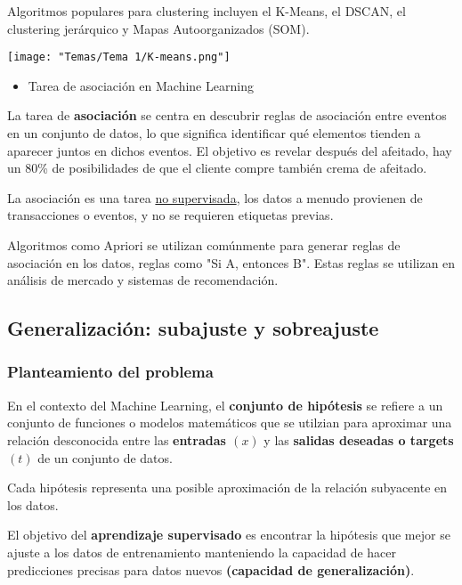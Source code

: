 Algoritmos populares para clustering incluyen el K-Means, el DSCAN, el clustering jerárquico y Mapas Autoorganizados (SOM).

\begin{center}
\texttt{[image: "Temas/Tema 1/K-means.png"]}
\end{center}
\begin{itemize}[label=\color{red}\textbullet, leftmargin=*]
	\item \color{lightblue}Tarea de asociación en Machine Learning
\end{itemize}

La tarea de \textbf{asociación} se centra en descubrir reglas de asociación entre eventos en un conjunto de datos, lo que significa identificar qué elementos tienden a aparecer juntos en dichos eventos. El objetivo es revelar después del afeitado, hay un 80\% de posibilidades de que el cliente compre también crema de afeitado.

La asociación es una tarea \underline{no supervisada}, los datos a menudo provienen de transacciones o eventos, y no se requieren etiquetas previas.

Algoritmos como Apriori se utilizan comúnmente para generar reglas de asociación en los datos, reglas como "Si A, entonces B". Estas reglas se utilizan en análisis de mercado y sistemas de recomendación.
\subsection{Generalización: subajuste y sobreajuste}
\subsubsection{Planteamiento del problema}
En el contexto del Machine Learning, el \textbf{conjunto de hipótesis} se refiere a un conjunto de funciones o modelos matemáticos que se utilzian para aproximar una relación desconocida entre las \textbf{entradas $(x)$} y las \textbf{salidas deseadas o targets $(t)$} de un conjunto de datos.

Cada hipótesis representa una posible aproximación de la relación subyacente en los datos.

El objetivo del \textbf{aprendizaje supervisado} es encontrar la hipótesis que mejor se ajuste a los datos de entrenamiento manteniendo la capacidad de hacer predicciones precisas para datos nuevos \textbf{(capacidad de generalización)}.

